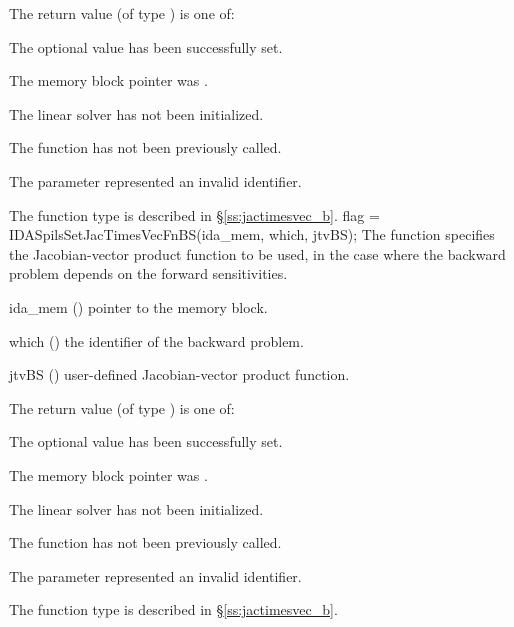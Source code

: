 {
  The return value  (of type ) is one of:
  \begin{args}
  \item[\Id{IDASPILS\_SUCCESS}] 
    The optional value has been successfully set.
  \item[\Id{IDASPILS\_MEM\_NULL}]
    The  memory block pointer was .
  \item[\Id{IDASPILS\_LMEM\_NULL}]
    The {\idaspils} linear solver has not been initialized.
  \item[\Id{IDASPILS\_NO\_ADJ}]
    The function  has not been previously called.
  \item[\Id{IDASPILS\_ILL\_INPUT}]
    The parameter  represented an invalid identifier.
  \end{args}
}
{
  The function type  is described in
  \S\ref{ss:jactimesvec_b}.
}
{
  flag = IDASpilsSetJacTimesVecFnBS(ida\_mem, which, jtvBS);
}
{
  The function  specifies the Jacobian-vector 
  product function to be used, in the case where the backward problem depends
  on the forward sensitivities.
}
{
  \begin{args}
  \item[ida\_mem] ()
    pointer to the {\idas} memory block.
  \item[which] ()
    the identifier of the backward problem.
  \item[jtvBS] ()
    user-defined Jacobian-vector product function.
  \end{args}
}
{
  The return value  (of type ) is one of:
  \begin{args}
  \item[\Id{IDASPILS\_SUCCESS}] 
    The optional value has been successfully set.
  \item[\Id{IDASPILS\_MEM\_NULL}]
    The  memory block pointer was .
  \item[\Id{IDASPILS\_LMEM\_NULL}]
    The {\idaspils} linear solver has not been initialized.
  \item[\Id{IDASPILS\_NO\_ADJ}]
    The function  has not been previously called.
  \item[\Id{IDASPILS\_ILL\_INPUT}]
    The parameter  represented an invalid identifier.
  \end{args}
}
{
  The function type  is described in
  \S\ref{ss:jactimesvec_b}.
}
